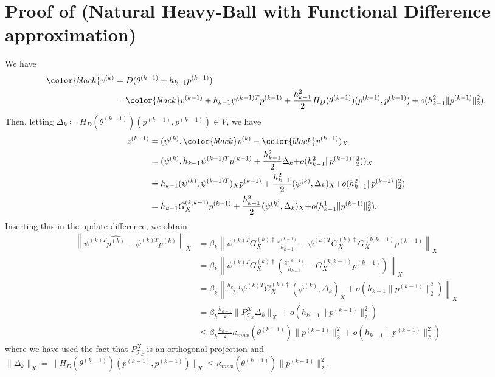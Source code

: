 \documentclass{article}
\theoremstyle{noparens}
\newcommand{\cT}{\mathcal{T}}
\newcommand{\colorM}{\color{black}}
\newcommand{\paramkm}{\theta^{(k-1)}}
\newcommand{\vk}{{\colorM v^{(k)}}}
\newcommand{\vkm}{{\colorM v^{(k-1)}}}
\newcommand{\psik}{\psi^{(k)}}
\newcommand{\psikT}{\psi^{(k)T}}
\newcommand{\psikmT}{\psi^{(k-1)T}}
\newcommand{\pk}{p^{(k)}}
\newcommand{\pkm}{p^{(k-1)}}
\newcommand{\GXinvk}{{G^{(k)\dagger}_X}}
\newcommand{\GXkkm}{{G^{(k,k-1)}_X}}
\begin{document}
\section{Proof of  (Natural Heavy-Ball with Functional Difference approximation)}
\label{sec:proof-nhb-fd}
We have
\begin{align*}
    \vk &= D(\paramkm + h_{k-1}\pkm  ) \\
    &= \vkm + h_{k-1}\psikmT\pkm + \frac{h_{k-1}^2}{2}H_D(\paramkm)(\pkm,\pkm) +  o(h_{k-1}^2\|\pkm\|_2^2).
\end{align*}
Then, letting $\Delta_k  \coloneqq H_D(\paramkm)(\pkm,\pkm) \in V$, we have
\begin{align*}
    z^{(k-1)}&=({\psik, \vk-\vkm})_X\\
    &=({\psik, h_{k-1}\psikmT\pkm + \frac{h_{k-1}^2}{2}\Delta_k {  + o(h_{k-1}^2\|\pkm\|_2^2)}})_X\\
    &=h_{k-1}({\psik, \psikmT})_X\pkm + \frac{h_{k-1}^2}{2}({\psik, \Delta_k})_X {  +    o(h_{k-1}^2\|\pkm\|_2^2)}\\
    &=h_{k-1}\GXkkm\pkm + \frac{h_{k-1}^2}{2}({\psik, \Delta_k})_X {  +   o(h_{k-1}^1\|\pkm\|_2^2)}.
\end{align*}
Inserting this in the update difference, we obtain
\begin{align*}
\left\|\psikT\widehat{\pk}-\psikT\pk\right\|_X
&= \beta_k\left\|\psikT\GXinvk \frac{z^{(k-1)}}{h_{k-1}}-\psikT\GXinvk\GXkkm\pkm\right\|_X\\
&= \beta_k\left\|\psikT\GXinvk\left(\frac{z^{(k-1)}}{h_{k-1}}-\GXkkm\pkm\right)\right\|_X\\
&= \beta_k\left\|\frac{h_{k-1}}{2}\psikT\GXinvk ({\psik,\Delta_k})_X+o(h_{k-1}\|\pkm\|_2^2)  \right\|_X \\
&= \beta_k \frac{h_{k-1}}{2} \| P^X_{\cT_k}\Delta_k \|_X +   o(h_{k-1}\|\pkm\|_2^2)    \\
&\le \beta_k \frac{h_{k-1}}{2} \kappa_{max}(\paramkm) \| \pkm\|_2^2 + o(h_{k-1}\|\pkm\|_2^2)
\end{align*}
where we have used the fact that $P^X_{\cT_k}$ is an orthogonal projection and $\|\Delta_{k}\|_X = \|H_D(\paramkm)(\pkm, \pkm)\|_X \leq \kappa_{max}(\paramkm) \| \pkm\|_2^2$.
\end{document}
